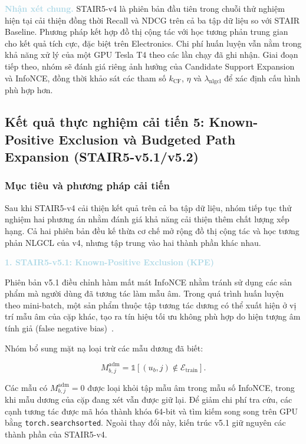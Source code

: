 \noindent\textcolor{lightblue}{\textbf{Nhận xét chung.}} STAIR5-v4 là phiên bản đầu tiên trong chuỗi thử nghiệm hiện tại cải thiện đồng thời Recall và NDCG trên cả ba tập dữ liệu so với STAIR Baseline. Phương pháp kết hợp đồ thị cộng tác với học tương phản trung gian cho kết quả tích cực, đặc biệt trên Electronics. Chi phí huấn luyện vẫn nằm trong khả năng xử lý của một GPU Tesla T4 theo các lần chạy đã ghi nhận. Giai đoạn tiếp theo, nhóm sẽ đánh giá riêng ảnh hưởng của Candidate Support Expansion và InfoNCE, đồng thời khảo sát các tham số $k_{\mathrm{CF}}$, $\eta$ và $\lambda_{\mathrm{nlgcl}}$ để xác định cấu hình phù hợp hơn.

\subsection{Kết quả thực nghiệm cải tiến 5: Known-Positive Exclusion và Budgeted Path Expansion (STAIR5-v5.1/v5.2)}

\subsubsection{Mục tiêu và phương pháp cải tiến}

Sau khi STAIR5-v4 cải thiện kết quả trên cả ba tập dữ liệu, nhóm tiếp tục thử nghiệm hai phương án nhằm đánh giá khả năng cải thiện thêm chất lượng xếp hạng. Cả hai phiên bản đều kế thừa cơ chế mở rộng đồ thị cộng tác và học tương phản NLGCL của v4, nhưng tập trung vào hai thành phần khác nhau.

\noindent\textcolor{lightblue}{\textbf{1. STAIR5-v5.1: Known-Positive Exclusion (KPE)}}

Phiên bản v5.1 điều chỉnh hàm mất mát InfoNCE nhằm tránh sử dụng các sản phẩm mà người dùng đã tương tác làm mẫu âm. Trong quá trình huấn luyện theo mini-batch, một sản phẩm thuộc tập tương tác dương có thể xuất hiện ở vị trí mẫu âm của cặp khác, tạo ra tín hiệu tối ưu không phù hợp do hiện tượng âm tính giả (false negative bias)~\cite{chuang2020debiased,khosla2020supervised}.

Nhóm bổ sung mặt nạ loại trừ các mẫu dương đã biết:

\begin{equation}
M_{b,j}^{\mathrm{adm}}
=
\mathbb{1}\left[
(u_b,j)\notin\mathcal{E}_{\mathrm{train}}
\right].
\end{equation}

Các mẫu có $M_{b,j}^{\mathrm{adm}}=0$ được loại khỏi tập mẫu âm trong mẫu số InfoNCE, trong khi mẫu dương của cặp đang xét vẫn được giữ lại. Để giảm chi phí tra cứu, các cạnh tương tác được mã hóa thành khóa 64-bit và tìm kiếm song song trên GPU bằng \texttt{torch.searchsorted}. Ngoài thay đổi này, kiến trúc v5.1 giữ nguyên các thành phần của STAIR5-v4.

